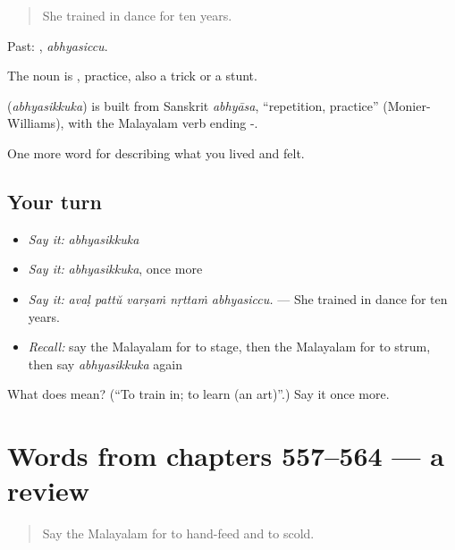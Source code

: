 \begin{quote}
She trained in dance for ten years.
\end{quote}

Past: , \emph{abhyasiccu}.

The noun is , practice, also a trick or a stunt.

\begin{cousinweb}
\textbf{} (\emph{abhyasikkuka}) is built from Sanskrit \emph{abhyāsa}, \textquotedblleft{}repetition, practice\textquotedblright{} (Monier-Williams), with the Malayalam verb ending -.
\end{cousinweb}

\begin{grammarlens}[title={What you've built}]
One more word for describing what you lived and felt.
\end{grammarlens}

\subsection*{Your turn}
\begin{itemize}
\raggedright
  \item \emph{Say it:} \emph{abhyasikkuka}
  \item \emph{Say it:} \emph{abhyasikkuka}, once more
  \item \emph{Say it:} \emph{avaḷ pattŭ varṣaṁ nṛttaṁ abhyasiccu.} — She trained in dance for ten years.
  \item \emph{Recall:} say the Malayalam for to stage, then the Malayalam for to strum, then say \emph{abhyasikkuka} again
\end{itemize}

\begin{tcolorbox}[breakable,colback=teal!4,colframe=teal!35!black,title={Before you move on}]
What does  mean? (\textquotedblleft{}To train in; to learn (an art)\textquotedblright{}.) Say it once more.
\end{tcolorbox}
\section[(dialogue)]{Words from chapters 557–564 — a review}

\label{lesson:ML-R564-review-557-564}



\begin{quote}
Say the Malayalam for to hand-feed and to scold.
\end{quote}

